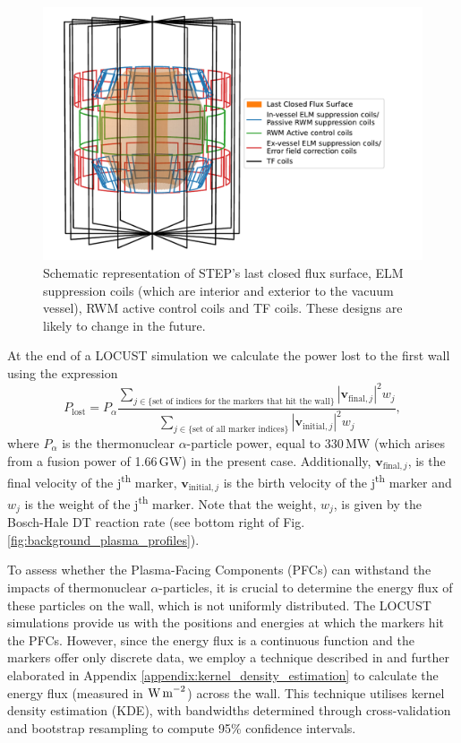 \documentclass[10pt, a4paper, twoside]{article}
\begin{document}
\begin{figure}[htpb]
    \centering
    \includegraphics[width=0.8\linewidth]{Figures/coil_plot_3d.pdf}
    \caption{Schematic representation of STEP’s last closed flux surface, ELM suppression coils (which are interior and exterior to the vacuum vessel), RWM active control coils and TF coils. These designs are likely to change in the future. 
}
    \label{fig:coil_plot_3d}
\end{figure}

At the end of a LOCUST simulation we calculate the power lost to the first wall using the expression 
\begin{equation} 
P_{\text{lost}} = P_\alpha \frac{\sum_{j\in \{\text{set of indices for the markers that hit the wall}\}}|\textbf{v}_{\text{final}, j}|^2w_j}{\sum_{j \in \{\text{set of all marker indices}\}} |\mathbf{v}_{\text{initial}, j}|^2w_j}, 
\end{equation}
where $P_\alpha$ is the thermonuclear $\alpha$-particle power, equal to 330\,MW (which arises from a fusion power of 1.66\,GW) in the present case. Additionally, $\mathbf{v}_{\text{final}, j}$,  is the final velocity of the j\textsuperscript{th} marker, $\mathbf{v}_{\text{initial}, j}$ is the birth velocity of the j\textsuperscript{th} marker and $w_j$ is the weight of the j\textsuperscript{th} marker. Note that the weight, $w_j$, is given by the Bosch-Hale DT reaction rate (see bottom right of Fig. \ref{fig:background_plasma_profiles}).

To assess whether the Plasma-Facing Components (PFCs) can withstand the impacts of thermonuclear $\alpha$-particles, it is crucial to determine the energy flux of these particles on the wall, which is not uniformly distributed. The LOCUST simulations provide us with the positions and energies at which the markers hit the PFCs. However, since the energy flux is a continuous function and the markers offer only discrete data, we employ a technique described in \cite{chen2017} and further elaborated in Appendix \ref{appendix:kernel_density_estimation} to calculate the energy flux (measured in $\text{W\,m}^{-2}$) across the wall. This technique utilises kernel density estimation (KDE), with bandwidths determined through cross-validation and bootstrap resampling to compute 95\% confidence intervals.
\end{document}
